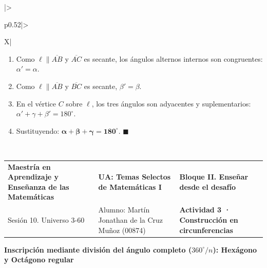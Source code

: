 \documentclass[spanish,letterpaper,landscape]{article}
\begin{document}
\begin{tabularx}{\textwidth}{|>{\raggedright\arraybackslash}p{0.52\textwidth}|>{\raggedright\arraybackslash}X|}
\begin{minipage}[t]{\linewidth}
  \par\smallskip
  \begin{enumerate}\leftskip=-12pt\setlength{\itemsep}{2pt}
    \item Como $\ell \parallel \overline{AB}$ y $\overline{AC}$ es secante, los ángulos alternos internos son congruentes: $\alpha' = \alpha$.
    \item Como $\ell \parallel \overline{AB}$ y $\overline{BC}$ es secante, $\beta' = \beta$.
    \item En el vértice $C$ sobre $\ell$, los tres ángulos son adyacentes y suplementarios: $\alpha' + \gamma + \beta' = 180^\circ$.
    \item Sustituyendo: $\mathbf{\alpha + \beta + \gamma = 180^\circ}$. \hfill$\blacksquare$
  \end{enumerate}
  \vspace{6pt}
\end{minipage} \\\hline
\end{tabularx}

\newpage
\noindent
\begin{tabularx}{\textwidth}{@{} >{\raggedright\arraybackslash}p{} >{\centering\arraybackslash}X >{\raggedleft\arraybackslash}p{} @{}}
\footnotesize \textbf{Maestría en Aprendizaje y Enseñanza de las Matemáticas} &
\footnotesize \textbf{UA: Temas Selectos de Matemáticas I} &
\footnotesize \textbf{Bloque II. Enseñar desde el desafío} \\
\footnotesize Sesión 10. Universo 3-60 &
\footnotesize Alumno: Martín Jonathan de la Cruz Muñoz (00874) &
\footnotesize \textbf{Actividad 3 · Construcción en circunferencias}
\end{tabularx}

\vspace{6pt}
\begin{center}
  {\normalsize\bfseries Inscripción mediante división del ángulo completo ($360^\circ / n$): Hexágono y Octágono regular}
\end{center}
\vspace{6pt}
\end{document}
